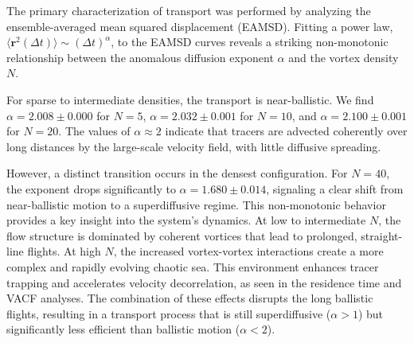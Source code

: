 \documentclass[]{article}
\begin{document}
The primary characterization of transport was performed by analyzing the ensemble-averaged mean squared displacement (EAMSD). Fitting a power law, $\langle \mathbf{r}^2(\Delta t) \rangle \sim (\Delta t)^\alpha$, to the EAMSD curves reveals a striking non-monotonic relationship between the anomalous diffusion exponent $\alpha$ and the vortex density $N$.

For sparse to intermediate densities, the transport is near-ballistic. We find $\alpha = 2.008 \pm 0.000$ for $N=5$, $\alpha = 2.032 \pm 0.001$ for $N=10$, and $\alpha = 2.100 \pm 0.001$ for $N=20$. The values of $\alpha \approx 2$ indicate that tracers are advected coherently over long distances by the large-scale velocity field, with little diffusive spreading.

However, a distinct transition occurs in the densest configuration. For $N=40$, the exponent drops significantly to $\alpha = 1.680 \pm 0.014$, signaling a clear shift from near-ballistic motion to a superdiffusive regime. This non-monotonic behavior provides a key insight into the system's dynamics. At low to intermediate $N$, the flow structure is dominated by coherent vortices that lead to prolonged, straight-line flights. At high $N$, the increased vortex-vortex interactions create a more complex and rapidly evolving chaotic sea. This environment enhances tracer trapping and accelerates velocity decorrelation, as seen in the residence time and VACF analyses. The combination of these effects disrupts the long ballistic flights, resulting in a transport process that is still superdiffusive ($\alpha > 1$) but significantly less efficient than ballistic motion ($\alpha < 2$).
\end{document}
